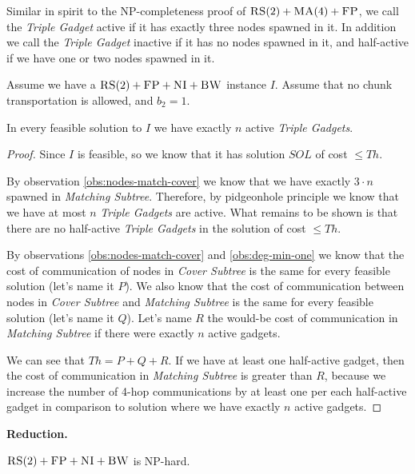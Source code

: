 \documentclass[preprint,12pt]{elsarticle}
\newcommand{\CC}{\textsc{NI}}
\newcommand{\FP}{\textsc{FP}}
\newcommand{\RS}{\textsc{RS}}
\newcommand{\BW}{\textsc{BW}}
\newcommand{\MA}{\textsc{MA}}
\newcommand{\MatchSubtree}{{\emph{Matching Subtree}}}
\newcommand{\CoverSubtree}{{\emph{Cover Subtree}}}
\newcommand{\TripleGadget}{{\emph{Triple Gadget}}}
\newcommand{\TripleGadgets}{{\emph{Triple Gadgets}}}
\newcommand{\CostCom}{\ensuremath{b_2}}
\newcommand{\Thr}{\ensuremath{Th}}
\newcommand{\Sol}{\ensuremath{SOL}}
\begin{document}
Similar in spirit to the NP-completeness proof of $\RS(2)+\MA(4)+\FP$,
we call the {\TripleGadget} active if it has exactly three nodes
spawned in it. In addition we call the {\TripleGadget} inactive if it
has no nodes spawned in it, and half-active if we have one or two
nodes spawned in it.

\begin{lemma}
  Assume we have a $\RS(2)+\FP+\CC+\BW$ instance $I$.  Assume that no
  chunk transportation is allowed, and $\CostCom = 1$.

  In every feasible solution to $I$ we have exactly $n$ active
  {\TripleGadgets}.
  \label{lem:full-or-empty}
\end{lemma}

\begin{proof}
  
  Since $I$ is feasible, so we know that it has solution $\Sol$ of
  cost $\leq \Thr$.
  
  By observation \ref{obs:nodes-match-cover} we know that we have
  exactly $3\cdot n$ spawned in {\MatchSubtree}. Therefore, by
  pidgeonhole principle we know that we have at most $n$
  {\TripleGadgets} are active. What remains to be shown is that there
  are no half-active {\TripleGadgets} in the solution of cost
  $\leq \Thr$.

  By observations \ref{obs:nodes-match-cover} and
  \ref{obs:deg-min-one} we know that the cost of communication of
  nodes in {\CoverSubtree} is the same for every feasible solution
  (let's name it $P$). We also know that the cost of communication
  between nodes in {\CoverSubtree} and {\MatchSubtree} is the same for
  every feasible solution (let's name it $Q$). Let's name $R$ the
  would-be cost of communication in {\MatchSubtree} if there were
  exactly $n$ active gadgets.

  We can see that $\Thr = P+Q+R$. If we have at least one half-active
  gadget, then the cost of communication in {\MatchSubtree} is greater
  than $R$, because we increase the number of 4-hop communications by
  at least one per each half-active gadget in comparison to solution
  where we have exactly $n$ active gadgets.
\end{proof}

\noindent \textbf{Reduction.}

\begin{theorem}
  $\RS(2)+\FP+\CC+\BW$ is NP-hard.
\end{theorem}
\end{document}
